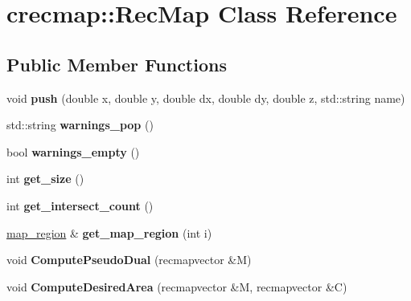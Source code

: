 \hypertarget{classcrecmap_1_1RecMap}{\section{crecmap\+:\+:Rec\+Map Class Reference}
\label{classcrecmap_1_1RecMap}
}
\subsection*{Public Member Functions}
\begin{DoxyCompactItemize}
\item 
\hypertarget{classcrecmap_1_1RecMap_ad034322b3373816bfa8ea9e6c436d00d}{void {\bfseries push} (double x, double y, double dx, double dy, double z, std\+::string name)}\label{classcrecmap_1_1RecMap_ad034322b3373816bfa8ea9e6c436d00d}

\item 
\hypertarget{classcrecmap_1_1RecMap_a278f40f1df14d64df4c4a9cd5595da3b}{std\+::string {\bfseries warnings\+\_\+pop} ()}\label{classcrecmap_1_1RecMap_a278f40f1df14d64df4c4a9cd5595da3b}

\item 
\hypertarget{classcrecmap_1_1RecMap_a404641cf7fcf47dc32e101a823f6edb4}{bool {\bfseries warnings\+\_\+empty} ()}\label{classcrecmap_1_1RecMap_a404641cf7fcf47dc32e101a823f6edb4}

\item 
\hypertarget{classcrecmap_1_1RecMap_a77f39e195bb75242aac9bccd910b1307}{int {\bfseries get\+\_\+size} ()}\label{classcrecmap_1_1RecMap_a77f39e195bb75242aac9bccd910b1307}

\item 
\hypertarget{classcrecmap_1_1RecMap_a870136e4477ed8644ddc4a844f0b89f9}{int {\bfseries get\+\_\+intersect\+\_\+count} ()}\label{classcrecmap_1_1RecMap_a870136e4477ed8644ddc4a844f0b89f9}

\item 
\hypertarget{classcrecmap_1_1RecMap_a51c4a66b8b847749af400606b63940e9}{\hyperlink{structcrecmap_1_1map__region}{map\+\_\+region} \& {\bfseries get\+\_\+map\+\_\+region} (int i)}\label{classcrecmap_1_1RecMap_a51c4a66b8b847749af400606b63940e9}

\item 
\hypertarget{classcrecmap_1_1RecMap_a7284e0b346080f52476497c26ec61fd2}{void {\bfseries Compute\+Pseudo\+Dual} (recmapvector \&M)}\label{classcrecmap_1_1RecMap_a7284e0b346080f52476497c26ec61fd2}

\item 
\hypertarget{classcrecmap_1_1RecMap_ac738bcd3b60e52e29e6855fdea17b230}{void {\bfseries Compute\+Desired\+Area} (recmapvector \&M, recmapvector \&C)}\label{classcrecmap_1_1RecMap_ac738bcd3b60e52e29e6855fdea17b230}


\end{DoxyCompactItemize}
